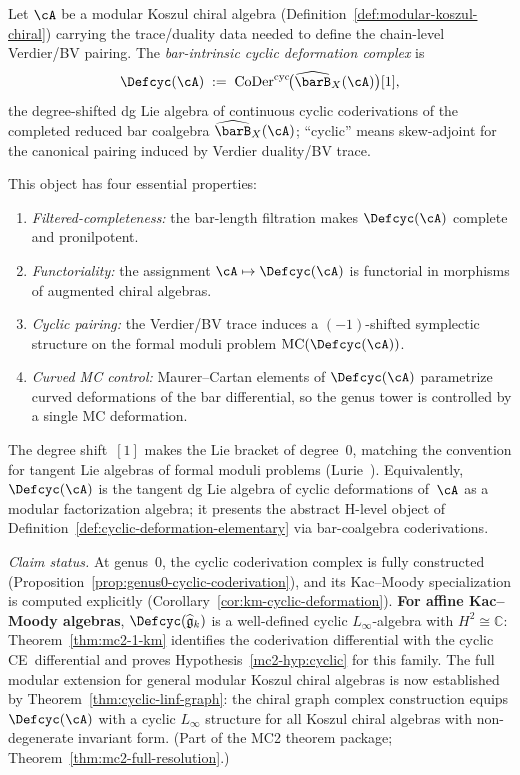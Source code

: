 \begin{definition}
\label{def:cyclic-deformation-bar}
Let $\cA$ be a modular Koszul chiral algebra
(Definition~\ref{def:modular-koszul-chiral}) carrying the trace/duality
data needed to define the chain-level Verdier/BV pairing.  The
\emph{bar-intrinsic cyclic deformation complex} is
\begin{equation}\label{eq:def-cyc-bar}
\Defcyc(\cA)
\;:=\;
\operatorname{CoDer}^{\mathrm{cyc}}\!\bigl(
  \widehat{\barB}_X(\cA)
\bigr)[1],
\end{equation}
the degree-shifted dg Lie algebra of continuous cyclic coderivations of
the completed reduced bar coalgebra $\widehat{\barB}_X(\cA)$; ``cyclic''
means skew-adjoint for the canonical pairing induced by Verdier
duality/BV trace.

This object has four essential properties:
\begin{enumerate}[label=\textup{(\roman*)}]
\item \emph{Filtered-completeness:} the bar-length filtration makes
  $\Defcyc(\cA)$ complete and pronilpotent.
\item \emph{Functoriality:} the assignment $\cA \mapsto \Defcyc(\cA)$
  is functorial in morphisms of augmented chiral algebras.
\item \emph{Cyclic pairing:} the Verdier/BV trace induces a
  $(-1)$-shifted symplectic structure on the formal moduli problem
  $\operatorname{MC}(\Defcyc(\cA))$.
\item \emph{Curved MC control:} Maurer--Cartan elements of
  $\Defcyc(\cA)$ parametrize curved deformations of the bar
  differential, so the genus tower is controlled by a single MC
  deformation.
\end{enumerate}
The degree shift~$[1]$ makes the Lie bracket of degree~$0$, matching
the convention for tangent Lie algebras of formal moduli problems
(Lurie~\cite{HA}).  Equivalently,
$\Defcyc(\cA)$ is the tangent dg Lie algebra of cyclic deformations
of~$\cA$ as a modular factorization algebra; it presents the abstract
H-level object of Definition~\ref{def:cyclic-deformation-elementary}
via bar-coalgebra coderivations.

\smallskip\noindent
\emph{Claim status.}
At genus~$0$, the cyclic coderivation complex is fully constructed
(Proposition~\ref{prop:genus0-cyclic-coderivation}), and its
Kac--Moody specialization is computed explicitly
(Corollary~\ref{cor:km-cyclic-deformation}).
\textbf{For affine Kac--Moody algebras}, $\Defcyc(\widehat{\mathfrak{g}}_k)$
is a well-defined cyclic $L_\infty$-algebra with
$H^2 \cong \mathbb{C}$: Theorem~\ref{thm:mc2-1-km} identifies the
coderivation differential with the cyclic CE~differential and proves
Hypothesis~\ref{mc2-hyp:cyclic} for this family.
The full modular extension for general modular Koszul chiral
algebras is now established by
Theorem~\ref{thm:cyclic-linf-graph}: the chiral graph complex
construction equips $\Defcyc(\cA)$ with a cyclic $L_\infty$
structure for all Koszul chiral algebras with non-degenerate
invariant form.
(Part of the MC2 theorem package; Theorem~\ref{thm:mc2-full-resolution}.)
\end{definition}

